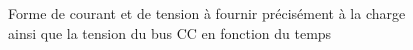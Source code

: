 \begin{figure}[htb]
\centering
{}
\caption{Forme de courant et de tension à fournir précisément à la charge ainsi que la tension du bus CC en fonction du temps}
\label{fig_Iref}
\end{figure}

